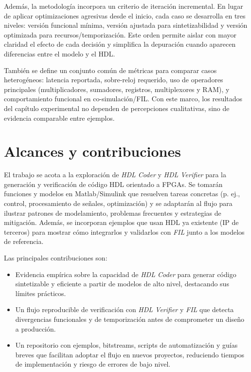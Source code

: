 Además, la metodología incorpora un criterio de iteración incremental. En lugar de aplicar optimizaciones agresivas desde el inicio, cada caso se desarrolla en tres niveles: versión funcional mínima, versión ajustada para sintetizabilidad y versión optimizada para recursos/temporización. Este orden permite aislar con mayor claridad el efecto de cada decisión y simplifica la depuración cuando aparecen diferencias entre el modelo y el HDL.

También se define un conjunto común de métricas para comparar casos heterogéneos: latencia reportada, sobre-reloj requerido, uso de operadores principales (multiplicadores, sumadores, registros, multiplexores y RAM), y comportamiento funcional en co-simulación/FIL. Con este marco, los resultados del capítulo experimental no dependen de percepciones cualitativas, sino de evidencia comparable entre ejemplos.

\section{Alcances y contribuciones}

El trabajo se acota a la exploración de \textit{HDL Coder} y \textit{HDL Verifier} para la generación y verificación de código HDL orientado a FPGAs. Se tomarán funciones y modelos en Matlab/Simulink que resuelven tareas concretas (p. ej., control, procesamiento de señales, optimización) y se adaptarán al flujo para ilustrar patrones de modelamiento, problemas frecuentes y estrategias de mitigación. Además, se incorporan ejemplos que usan HDL ya existente (IP de terceros) para mostrar cómo integrarlos y validarlos con \textit{FIL} junto a los modelos de referencia.


Las principales contribuciones son:

\begin{itemize}
    \item Evidencia empírica sobre la capacidad de \textit{HDL Coder} para generar código sintetizable y eficiente a partir de modelos de alto nivel, destacando sus límites prácticos.
    \item Un flujo reproducible de verificación con \textit{HDL Verifier} y \textit{FIL} que detecta divergencias funcionales y de temporización antes de comprometer un diseño a producción.
    \item Un repositorio con ejemplos, bitstreams, scripts de automatización y guías breves que facilitan adoptar el flujo en nuevos proyectos, reduciendo tiempos de implementación y riesgo de errores de bajo nivel.
\end{itemize}

